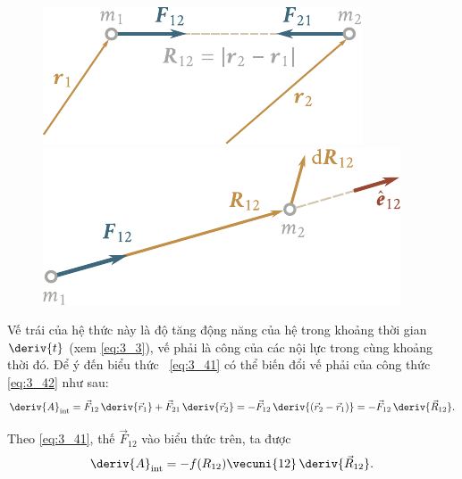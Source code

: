 \begin{figure}[!htb]
	\begin{minipage}[t]{0.5\linewidth}
		\begin{center}
			\includegraphics[scale=0.89]{figures/ch_03/fig_3_11.pdf}
			\caption[]{}
			\label{fig:3_11}
		\end{center}
	\end{minipage}
	\hspace{-0.05cm}
	\begin{minipage}[t]{0.5\linewidth}
		\begin{center}
			\includegraphics[scale=0.89]{figures/ch_03/fig_3_12.pdf}
			\caption[]{}
			\label{fig:3_12}
		\end{center}
	\end{minipage}
\end{figure}

\noindent
Vế trái của hệ thức này là độ tăng động năng của hệ trong khoảng thời gian $\deriv{t}$ (xem \eqref{eq:3_3}), vế phải là công của các nội lực trong cùng khoảng thời đó.
Để ý đến biểu thức ~\eqref{eq:3_41} có thể biến đổi vế phải của công thức \eqref{eq:3_42} như sau:
\begin{equation}\label{eq:3_43}
\deriv{A}_{\text{int}} = \vec{F}_{12}\,\deriv{\vec{r}_1} + \vec{F}_{21}\,\deriv{\vec{r}_2} = -\vec{F}_{12}\,\deriv{(\vec{r}_2-\vec{r}_1)} = -\vec{F}_{12}\,\deriv{\vec{R}_{12}}.
\end{equation}

\noindent
Theo \eqref{eq:3_41}, thế $\vec{F}_{12}$ vào biểu thức trên, ta được 
\begin{equation*}
\deriv{A}_{\text{int}} = - f(R_{12}) \vecuni{12} \, \deriv{\vec{R}_{12}}.
\end{equation*}

